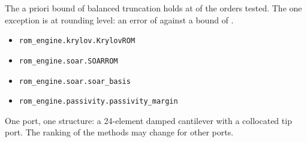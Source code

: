\newpage\thispagestyle{hl}
\par
{}
\begin{hlheadline}The a priori bound of balanced truncation holds at \cbtBoundHolds{} of the \cbtBoundCases{} orders tested. The one exception is at rounding level: an error of \cbtMissErr{} against a bound of \cbtMissBound.\end{hlheadline}
{\begin{itemize}\setlength\itemsep{2pt}
\item \texttt{rom\_engine.krylov.KrylovROM}
\item \texttt{rom\_engine.soar.SOARROM}
\item \texttt{rom\_engine.soar.soar\_basis}
\item \texttt{rom\_engine.passivity.passivity\_margin}
\end{itemize}}
\begin{hllimit}One port, one structure: a 24-element damped cantilever with a collocated tip port. The ranking of the methods may change for other ports.\end{hllimit}
